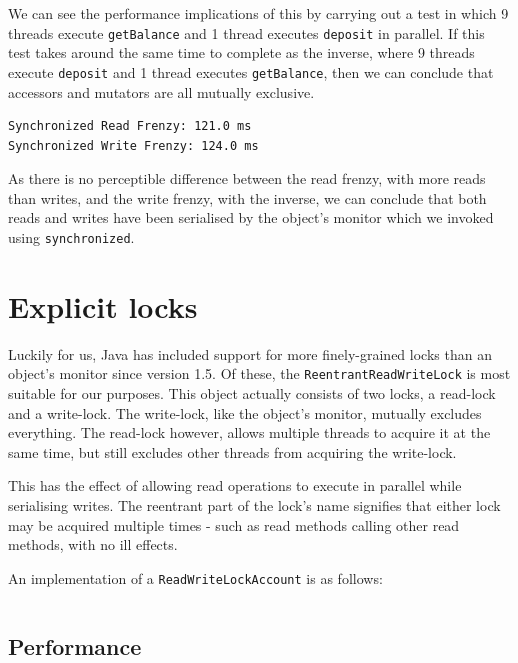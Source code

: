 \documentclass[a4paper,12pt]{kth-mag}
\begin{document}
We can see the performance implications of this by carrying out a test in which 9 threads execute \texttt{getBalance} and 1 thread executes \texttt{deposit} in parallel. If this test takes around the same time to complete as the inverse, where 9 threads execute \texttt{deposit} and 1 thread executes \texttt{getBalance}, then we can conclude that accessors and mutators are all mutually exclusive.

\begin{listing}[H]
	\begin{verbatim}
Synchronized Read Frenzy: 121.0 ms
Synchronized Write Frenzy: 124.0 ms
	\end{verbatim}
\end{listing}

As there is no perceptible difference between the read frenzy, with more reads than writes, and the write frenzy, with the inverse, we can conclude that both reads and writes have been serialised by the object's monitor which we invoked using \texttt{synchronized}.

\section{Explicit locks}

Luckily for us, Java has included support for more finely-grained locks than an object's monitor since version 1.5. Of these, the \texttt{ReentrantReadWriteLock} is most suitable for our purposes. This object actually consists of two locks, a read-lock and a write-lock. The write-lock, like the object's monitor, mutually excludes everything. The read-lock however, allows multiple threads to acquire it at the same time, but still excludes other threads from acquiring the write-lock.

This has the effect of allowing read operations to execute in parallel while serialising writes. The reentrant part of the lock's name signifies that either lock may be acquired multiple times - such as read methods calling other read methods, with no ill effects.

An implementation of a \texttt{ReadWriteLockAccount} is as follows:

 \begin{listing}[H]
    \inputminted[firstline=4,linenos=true,bgcolor=code]{java}{../java_accounts/ReadWriteLockAccount.java}
\end{listing}

\subsection{Performance}
\end{document}
